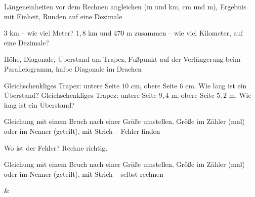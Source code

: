 \begin{aufgabe}{Längeneinheiten vor dem Rechnen angleichen (m und km, cm und m), Ergebnis mit Einheit, Runden auf eine Dezimale}
\begin{teile}
\teil $3$ km – wie viel Meter? \leerfeld[m]
\teil $1{,}8$ km und $470$ m zusammen – wie viel Kilometer, auf eine Dezimale? \leerfeld[km]
\end{teile}
\end{aufgabe}

\begin{aufgabe}{Höhe, Diagonale, Überstand am Trapez, Fußpunkt auf der Verlängerung beim Parallelogramm, halbe Diagonale im Drachen}
\begin{teile}
\teil Gleichschenkliges Trapez: untere Seite $10$ cm, obere Seite $6$ cm. Wie lang ist ein Überstand? \leerfeld[cm]
\teil Gleichschenkliges Trapez: untere Seite $9{,}4$ m, obere Seite $5{,}2$ m. Wie lang ist ein Überstand? \leerfeld[m]
\end{teile}
\end{aufgabe}

\begin{aufgabe}{Gleichung mit einem Bruch nach einer Größe umstellen, Größe im Zähler (mal) oder im Nenner (geteilt), mit Strich – Fehler finden}
\begin{teile}
\teil Wo ist der Fehler? Rechne richtig. 
\end{teile}
\end{aufgabe}

\begin{aufgabe}{Gleichung mit einem Bruch nach einer Größe umstellen, Größe im Zähler (mal) oder im Nenner (geteilt), mit Strich – selbst rechnen}
\begin{gleichungsraster}[2]
 & \\
\end{gleichungsraster}
\end{aufgabe}
